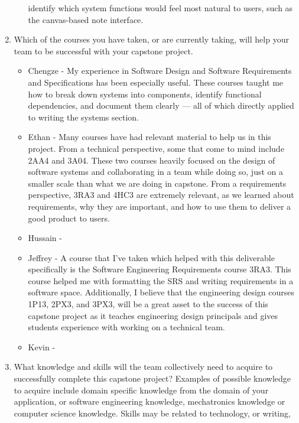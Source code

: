 \begin{enumerate}
\begin{itemize}
        identify which system functions would feel most natural to users, such 
        as the canvas-based note interface.
  \end{itemize} 
  \item Which of the courses you have taken, or are currently taking, will help
  your team to be successful with your capstone project.
  \begin{itemize}
        \item Chengze - My experience in Software Design and Software Requirements 
        and Specifications has been especially useful. These courses taught me how 
        to break down systems into components, identify functional dependencies, and 
        document them clearly — all of which directly applied to writing the systems section.
        \item Ethan - Many courses have had relevant material to help us in
          this project. From a technical perspective, some that come to mind
          include 2AA4 and 3A04. These two courses heavily focused on the
          design of software systems and collaborating in a team while doing
          so, just on a smaller scale than what we are doing in capstone. From
          a requirements perspective, 3RA3 and 4HC3 are extremely relevant, as
          we learned about requirements, why they are important, and how to use
          them to deliver a good product to users.
        \item Hussain - 
        \item Jeffrey - A course that I've taken which helped with this deliverable
        specifically is the Software Engineering Requirements course 3RA3. This course
        helped me with formatting the SRS and writing requirements in a software space.
        Additionally, I believe that the engineering design courses 1P13, 2PX3, 
        and 3PX3, will be a great asset to the success of this capstone project 
        as it teaches engineering design principals and gives students experience 
        with working on a technical team. 
        \item Kevin - 
  \end{itemize} 
  \item What knowledge and skills will the team collectively need to acquire to
  successfully complete this capstone project?  Examples of possible knowledge
  to acquire include domain specific knowledge from the domain of your
  application, or software engineering knowledge, mechatronics knowledge or
  computer science knowledge.  Skills may be related to technology, or writing,

\end{enumerate}
